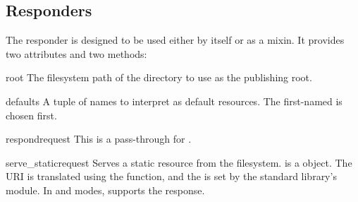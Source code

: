 \subsection{ Responders \label{static}}

The  responder is designed to be used either by itself or as a
mixin. It provides two attributes and two methods:

\begin{memberdesc}[string]{root}
The filesystem path of the directory to use as the publishing root.
\end{memberdesc}

\begin{memberdesc}[tuple]{defaults}
A tuple of names to interpret as default resources. The first-named is chosen
first.
\end{memberdesc}


\begin{methoddesc}{respond}{request}
This is a pass-through for .
\end{methoddesc}

\begin{methoddesc}{serve_static}{request} Serves a static resource from the
filesystem.  is a  object. The URI is translated
using the  function, and the
 is set by the standard library's
 module. In
 and  modes,  supports the
response.
\end{methoddesc}

